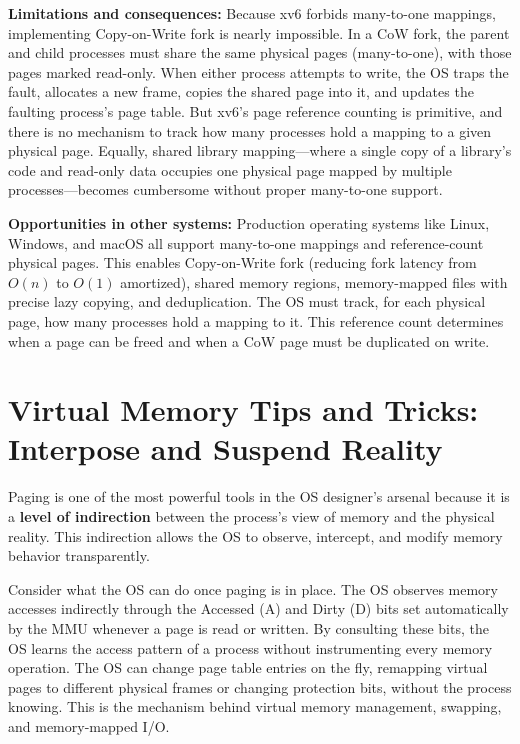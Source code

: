 \documentclass[11pt]{article}
\begin{document}
\textbf{Limitations and consequences:} Because xv6 forbids many-to-one mappings, implementing Copy-on-Write fork is nearly impossible. In a CoW fork, the parent and child processes must share the same physical pages (many-to-one), with those pages marked read-only. When either process attempts to write, the OS traps the fault, allocates a new frame, copies the shared page into it, and updates the faulting process's page table. But xv6's page reference counting is primitive, and there is no mechanism to track how many processes hold a mapping to a given physical page. Equally, shared library mapping—where a single copy of a library's code and read-only data occupies one physical page mapped by multiple processes—becomes cumbersome without proper many-to-one support.

\textbf{Opportunities in other systems:} Production operating systems like Linux, Windows, and macOS all support many-to-one mappings and reference-count physical pages. This enables Copy-on-Write fork (reducing fork latency from $O(n)$ to $O(1)$ amortized), shared memory regions, memory-mapped files with precise lazy copying, and deduplication. The OS must track, for each physical page, how many processes hold a mapping to it. This reference count determines when a page can be freed and when a CoW page must be duplicated on write.

\section{Virtual Memory Tips and Tricks: Interpose and Suspend Reality}

Paging is one of the most powerful tools in the OS designer's arsenal because it is a \textbf{level of indirection} between the process's view of memory and the physical reality. This indirection allows the OS to observe, intercept, and modify memory behavior transparently.

Consider what the OS can do once paging is in place. The OS observes memory accesses indirectly through the Accessed (A) and Dirty (D) bits set automatically by the MMU whenever a page is read or written. By consulting these bits, the OS learns the access pattern of a process without instrumenting every memory operation. The OS can change page table entries on the fly, remapping virtual pages to different physical frames or changing protection bits, without the process knowing. This is the mechanism behind virtual memory management, swapping, and memory-mapped I/O.
\end{document}
